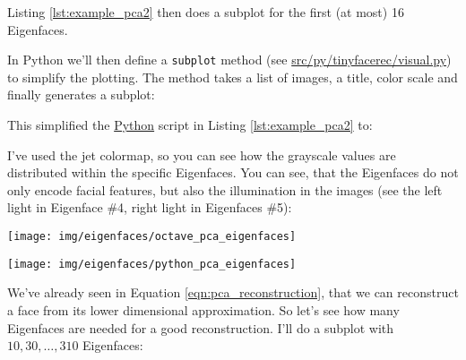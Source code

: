 	

\else
	
\fi

\ifx\python\undefined 

Listing \ref{lst:example_pca2} then does a subplot for the first (at most) 16 Eigenfaces. 

\else 

In Python we'll then define a \lstinline|subplot| method (see \url{src/py/tinyfacerec/visual.py}) to simplify the plotting. The method takes a list of images, a title, color scale and finally generates a subplot:



This simplified the \href{http://www.python.org}{Python} script in Listing \ref{lst:example_pca2} to:
\fi

\ifx\python\undefined
	
\else
	
\fi

I've used the jet colormap, so you can see how the grayscale values are distributed within the specific Eigenfaces. You can see, that the Eigenfaces do not only encode facial features, but also the illumination in the images (see the left light in Eigenface \#4, right light in Eigenfaces \#5):

\ifx\python\undefined
\begin{center}
	\texttt{[image: img/eigenfaces/octave\_pca\_eigenfaces]}
\end{center}
\else
	\begin{center}
		\texttt{[image: img/eigenfaces/python\_pca\_eigenfaces]}
	\end{center}
\fi

We've already seen in Equation \ref{eqn:pca_reconstruction}, that we can reconstruct a face from its lower dimensional approximation. So let's see how many Eigenfaces are needed for a good reconstruction. I'll do a subplot with $10,30,\ldots,310$ Eigenfaces:

